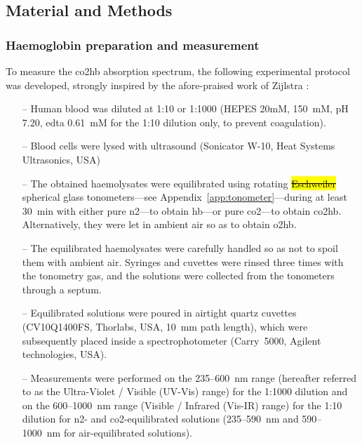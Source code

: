 \subsection{Material and Methods}

\subsubsection{Haemoglobin preparation and measurement}\label{subsect:co2hb:pulse_carbametry:hb_prep}

To measure the \gls{co2hb} absorption spectrum, the following experimental protocol was developed, strongly inspired by the afore-praised work of Zijlstra \etal{}\cite{zijlstra2000}:

\begin{itemize}
	\item[--] Human blood was diluted at 1:10 or 1:1000 (HEPES 20mM,  150~mM, pH 7.20, \gls{edta} 0.61~mM for the 1:10 dilution only, to prevent coagulation).
	\item[--] Blood cells were lysed with ultrasound (Sonicator W-10, Heat Systems Ultrasonics, USA)
	\item[--] The obtained haemolysates were equilibrated using rotating \hl{\st{Eschweiler}} spherical glass tonometers---see Appendix~\ref{app:tonometer}---during at least 30~min with either pure \gls{n2}---to obtain \gls{hb}---or pure \gls{co2}---to obtain \gls{co2hb}. Alternatively, they were let in ambient air so as to obtain \gls{o2hb}.
	\item[--] The equilibrated haemolysates were carefully handled so as not to spoil them with ambient air. Syringes and cuvettes were rinsed three times with the tonometry gas, and the solutions were collected from the tonometers through a septum.
	\item[--] Equilibrated solutions were poured in airtight quartz cuvettes (CV10Q1400FS, Thorlabs, USA, 10~mm path length), which were subsequently placed inside a spectrophotometer (Carry~5000, Agilent technologies, USA).
	\item[--] Measurements were performed on the 235--600~nm range (hereafter referred to as the Ultra-Violet / Visible (UV-Vis) range) for the 1:1000 dilution and on the 600--1000~nm range (Visible / Infrared (Vis-IR) range) for the 1:10 dilution for \gls{n2}- and \gls{co2}-equilibrated solutions (235--590~nm and 590--1000~nm for air-equilibrated solutions).
\end{itemize}

